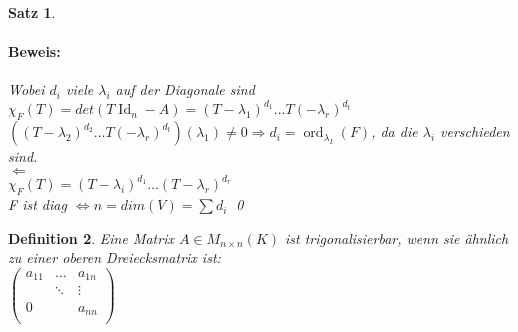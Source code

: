 \documentclass{report}
\newcommand{\lb}{\lambda}
\DeclareMathOperator{\Id}{Id}
\DeclareMathOperator{\ord}{ord}
\theoremstyle{customrem}
\theoremstyle{customdef}
\newtheorem{definition}{Definition}[chapter]
\newtheorem{satz}[definition]{Satz}
\renewenvironment{proof}{\paragraph{Beweis: }}{\qed}
\theoremstyle{customenv}
\begin{document}
\begin{satz}
\begin{proof}
    Wobei \(d_i\) viele \(\lb_i\) auf der Diagonale sind\\
    \(\chi_F(T) = det(T \Id_n - A) = (T - \lb_1)^{d_1} \dots T(-\lb_r)^{d_t}\)
    \(((T - \lb_2)^{d_2} \dots T(-\lb_r)^{d_t})(\lb_1) \neq 0
    \Rightarrow d_i = \ord_{\lb_I}(F)
    \), da die \(\lb_i\) verschieden sind.\\
    \(\Leftarrow\)\\
    \(\chi_F(T) = (T - \lb_i)^{d_1} \dots (T - \lb_r)^{d_r}\)\\
    F ist diag \(\Leftrightarrow n = dim(V) = \sum d_i\)
  \end{proof}
\end{satz}


\begin{definition}
  Eine Matrix \(A \in M_{n\times n}(K)\) ist 
  trigonalisierbar, wenn sie \"ahnlich zu einer oberen  Dreiecksmatrix ist:\\
  \(
    \begin{pmatrix}
    a_{11} & \dots  & a_{1n}\\
           & \ddots & \vdots\\
    0      &        & a_{nn}\\
    \end{pmatrix}
  \)
\end{definition}
\end{document}
